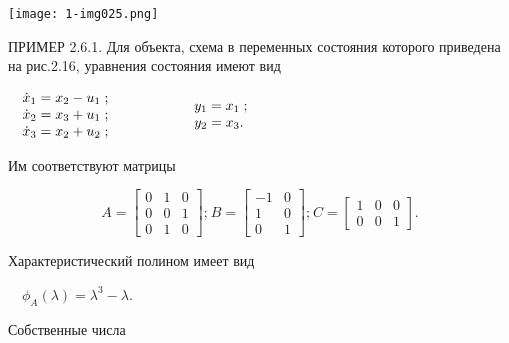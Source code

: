 \documentclass[a4paper]{article}
\begin{document}
\bigskip

{\centering  \texttt{[image: 1-img025.png]} \par}
{\begin{russian}\sffamily
ПРИМЕР 2.6.1. Для объекта, схема в переменных состояния которого приведена на рис.2.16, уравнения состояния имеют вид
\end{russian}}

{\begin{russian}\sffamily
\ \  $\begin{matrix}\dot x_1=x_2-u_1\;;\hfill\null \\\dot x_2=x_3+u_1\;;\hfill\null \\\dot x_3=x_2+u_2\;;\hfill\null
\end{matrix}\hfill $ \ \ \ \ \ \ \ \ \ \ \  $\begin{matrix}y_1=x_1\;;\hfill\null \\y_2=x_3.\hfill\null
\end{matrix}\hfill $
\end{russian}}

{\begin{russian}\sffamily
Им соответствуют матрицы
\end{russian}}

\begin{equation*}
A=\left[\begin{matrix}0&1&0\\0&0&1\\0&1&0\end{matrix}\right];_{}^{}B=\left[\begin{matrix}-1&0\\1&0\\0&1\end{matrix}\right];_{}^{}C=\left[\begin{matrix}1&0&0\\0&0&1\end{matrix}\right].
\end{equation*}
{\begin{russian}\sffamily
Характеристический полином имеет вид
\end{russian}}

{\begin{russian}\sffamily
\ \  $ϕ_A(λ)=λ^3-λ$.
\end{russian}}

{\begin{russian}\sffamily
Собственные числа
\end{russian}}
\end{document}
